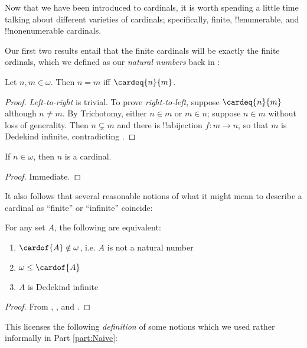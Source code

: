 \documentclass[../../../include/open-logic-section]{subfiles}
\begin{document}
Now that we have been introduced to cardinals, it is worth spending a little time talking about different varieties of cardinals; specifically, finite, !!{enumerable}, and !!{nonenumerable} cardinals. 

Our first two results entail that the finite cardinals will be exactly the finite ordinals, which we defined as our \emph{natural numbers} back in : 
\begin{prop}
	Let $n, m \in \omega$. Then $n = m$ iff $\cardeq{n}{m}$.
\end{prop}
\begin{proof}
	\emph{Left-to-right} is trivial. To prove \emph{right-to-left}, suppose $\cardeq{n}{m}$ although $n \neq m$. By Trichotomy, either $n \in m$ or $m \in n$; suppose $n \in m$ without loss of generality. Then $n \subsetneq m$ and there is !!a{bijection} $f \colon m \to n$, so that $m$ is Dedekind infinite, contradicting .
\end{proof}
\begin{cor}
	If $n \in \omega$, then $n$ is a cardinal. 
\end{cor}
\begin{proof}
	Immediate.
\end{proof}\noindent
It also follows that several reasonable notions of what it might mean to describe a cardinal as ``finite'' or ``infinite'' coincide:
\begin{thm}For any set $A$, the following are equivalent:
	\begin{enumerate}
		\item{} $\cardof{A} \notin \omega$, i.e. $A$ is not a natural number
		\item{} $\omega \leq \cardof{A}$ 
		\item{} $A$ is Dedekind infinite	
	\end{enumerate}
\end{thm}
\begin{proof}
	From , , and . 
\end{proof}\noindent
This licenses the following \emph{definition} of some notions which we used rather informally in Part \ref{part:Naive}:
\end{document}
